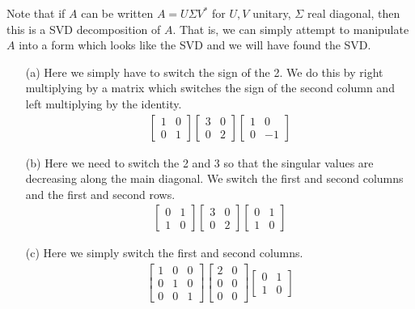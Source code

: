 \documentclass[10pt]{article}
\begin{document}
\begin{solution}[Solution]
Note that if \( A \) can be written \( A=U\Sigma V^* \) for \( U,V \) unitary, \( \Sigma \) real diagonal, then this is a SVD decomposition of \( A \). That is, we can simply attempt to manipulate \( A \) into a form which looks like the SVD and we will have found the SVD.

\begin{enumerate}
    \item[(a)]Here we simply have to switch the sign of the 2. We do this by right multiplying by a matrix which switches the sign of the second column and left multiplying by the identity.
        \begin{align*}
            \left[\begin{array}{cc}1 & 0\\0 & 1\end{array}\right]\left[\begin{array}{cc}3 & 0\\0 & 2\end{array}\right] \left[\begin{array}{cc}1 & 0 \\ 0 & -1\end{array}\right]
        \end{align*}
    \item[(b)]Here we need to switch the 2 and 3 so that the singular values are decreasing along the main diagonal. We switch the first and second columns and the first and second rows. 
         \begin{align*}
             \left[\begin{array}{cc}0 & 1\\1 & 0\end{array}\right]\left[\begin{array}{cc}3 & 0\\0 & 2\end{array}\right] \left[\begin{array}{cc}0 & 1\\1 & 0\end{array}\right]
        \end{align*}
    \item[(c)]Here we simply switch the first and second columns. 
        \begin{align*}
            \left[\begin{array}{ccc}1 & 0 & 0\\0 & 1 & 0\\0 & 0 & 1\end{array}\right] \left[\begin{array}{cc}2 & 0\\0 & 0\\0 & 0\end{array}\right] \left[\begin{array}{cc}0 & 1\\1 & 0\end{array}\right]

\end{align*}
\end{enumerate}
\end{solution}
\end{document}
